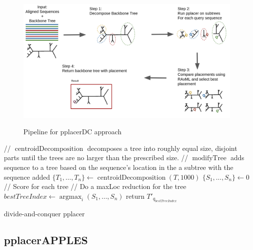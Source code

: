 \documentclass[10pt]{article}
\begin{document}

\begin{figure}[h]
\centering
\includegraphics[width=\textwidth]{Figs/pplacerDCpipeline.png}
\label{fig:pplacerDC-pipeline}
\caption{Pipeline for pplacerDC approach
}
\end{figure}

\begin{algorithm}[H]
\SetAlgoLined
{}
 // $\operatorname{centroidDecomposition}$ decomposes a tree into roughly equal size, disjoint parts until the trees are no larger than the prescribed size.\;
 // $\operatorname{modifyTree}$ adds sequence to a tree based on the sequence's location in the a subtree with the sequence added\;
 $\{T_1,\dots,T_n\} \leftarrow \operatorname{centroidDecomposition}(T,1000)$\;
 $\{S_1, \dots, S_n\} \leftarrow 0$ // Score for each tree\;
 // Do a maxLoc reduction for the tree\;
 $bestTreeIndex \leftarrow \operatorname{argmax}_{i} (S_1,\dots,S_n)$\;
 return $T'_{q_{bestTreeIndex}}$\;
 \caption{divide-and-conquer pplacer}
 \label{alg:approach1}
\end{algorithm}

\subsection{pplacerAPPLES}
\end{document}
